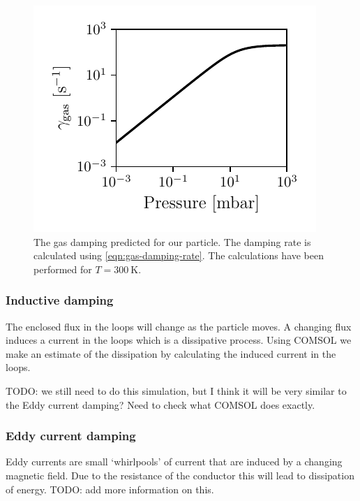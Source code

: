 \begin{figure}
    \centering
    \includegraphics{figures/data/gas_damping.pdf}
    \caption{The gas damping predicted for our particle. The damping rate is calculated using \autoref{eqn:gas-damping-rate}. The calculations have been performed for $T=\qty{300}{\kelvin}$.}
    \label{fig:gas-damping}
\end{figure}

\subsubsection{Inductive damping}
\label{subsubsec:inductive-damping}
The enclosed flux in the loops will change as the particle moves. A changing flux induces a current in the loops which is a dissipative process. Using COMSOL we make an estimate of the dissipation by calculating the induced current in the loops.

TODO: we still need to do this simulation, but I think it will be very similar to the Eddy current damping? Need to check what COMSOL does exactly.

\subsubsection{Eddy current damping}
\label{subsubsec:eddy-current-damping}
Eddy currents are small `whirlpools' of current that are induced by a changing magnetic field. Due to the resistance of the conductor this will lead to dissipation of energy.
TODO: add more information on this.

